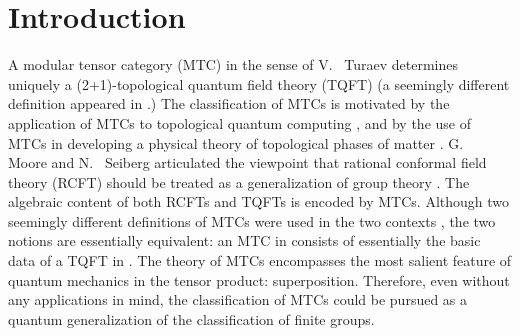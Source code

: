 \documentclass[12pt,psamsfonts]{amsart}
\numberwithin{equation}{section}
\theoremstyle{definition}
\begin{document}
\begin{abstract}
Discovery of non-abelain anyons in Nature will be a landmark in
condensed matter physics.  The non-abelian anyons in UMTCs of rank
$\leq 4$ are the simplest, and, therefore, are most likely to be
found.  G.~ Moore and N.~ Read proposed that non-abelian
statistics could occur in fractional quantum Hall (FQH) liquids.
The Read-Rezayi conjecture predicts the existence of anyons
related to $SU(2)_k$ in FQH liquids at filling fractions
$\nu=2+\frac{k}{k+2}$ for $k=1,2,3$. For $\nu=\frac{5}{2}$ and
$SU(2)_2$, there is a numerical proof and experimental evidence
for this conjecture. The Ising anyons might exist in chiral
superconductors (strontium ruthenate). There are theoretical
designs for the toric code MTC using Josephson junction array, for
the $Fib\times Fib$ MTC using optical lattice, and for the
$SU(2)_k$ using cold trapped bosonic atoms. More comments can be
found at the end of the introduction.

\fi

\end{abstract}
\maketitle

\section{Introduction}

\label{s:intro}

A modular tensor category (MTC) in the sense of V.~ Turaev
determines uniquely a (2+1)-topological quantum field theory
(TQFT) \cite{Turaev} (a seemingly different definition appeared in
\cite{MS1}.)  The classification of MTCs is motivated by the
application of MTCs to topological quantum computing
\cite{Freedman1}\cite{Kitaev1}\cite{FKW}\cite{FLWu}\cite{FKLW}\cite{Preskill},
and by the use of MTCs in developing a physical theory of
topological phases of matter
\cite{Wilczek}\cite{MR}\cite{FNTW}\cite{Kitaev2}\cite{Wang}\cite{LW}\cite{DFN}.
G.~ Moore and N.~ Seiberg articulated the viewpoint that rational
conformal field theory (RCFT) should be treated as a
generalization of group theory \cite{MS2}.  The algebraic content
of both RCFTs and TQFTs is encoded by MTCs. Although two seemingly
different definitions of MTCs were used in the two contexts
\cite{MS1}\cite{Turaev}, the two notions are essentially
equivalent: an MTC in \cite{MS1} consists of essentially the basic
data of a TQFT in \cite{Walker}.  The theory of MTCs encompasses
the most salient feature of quantum mechanics in the tensor
product: superposition. Therefore, even without any applications
in mind, the classification of MTCs could be pursued as a quantum
generalization of the classification of finite groups.
\end{document}
